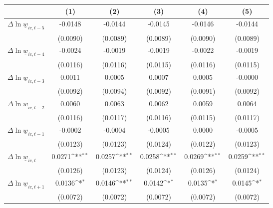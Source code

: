 {
\def\sym#1{\ifmmode^{#1}\else\(^{#1}\)\fi}
\begin{tabular}{l*{5}{c}}
\hline\hline
          &\multicolumn{1}{c}{(1)}         &\multicolumn{1}{c}{(2)}         &\multicolumn{1}{c}{(3)}         &\multicolumn{1}{c}{(4)}         &\multicolumn{1}{c}{(5)}         \\
\hline
$\Delta \ln \underline{w}_{ic,t-5}$&  -0.0148         &  -0.0144         &  -0.0145         &  -0.0146         &  -0.0144         \\
          & (0.0090)         & (0.0089)         & (0.0089)         & (0.0090)         & (0.0089)         \\
[1em]
$\Delta \ln \underline{w}_{ic,t-4}$&  -0.0024         &  -0.0019         &  -0.0019         &  -0.0022         &  -0.0019         \\
          & (0.0116)         & (0.0116)         & (0.0115)         & (0.0116)         & (0.0115)         \\
[1em]
$\Delta \ln \underline{w}_{ic,t-3}$&   0.0011         &   0.0005         &   0.0007         &   0.0005         &  -0.0000         \\
          & (0.0092)         & (0.0094)         & (0.0092)         & (0.0091)         & (0.0092)         \\
[1em]
$\Delta \ln \underline{w}_{ic,t-2}$&   0.0060         &   0.0063         &   0.0062         &   0.0059         &   0.0064         \\
          & (0.0116)         & (0.0117)         & (0.0116)         & (0.0115)         & (0.0117)         \\
[1em]
$\Delta \ln \underline{w}_{ic,t-1}$&  -0.0002         &  -0.0004         &  -0.0005         &   0.0000         &  -0.0005         \\
          & (0.0123)         & (0.0123)         & (0.0124)         & (0.0122)         & (0.0123)         \\
[1em]
$\Delta \ln \underline{w}_{ic,t}$&   0.0271\sym{**} &   0.0257\sym{**} &   0.0258\sym{**} &   0.0269\sym{**} &   0.0259\sym{**} \\
          & (0.0126)         & (0.0123)         & (0.0124)         & (0.0126)         & (0.0124)         \\
[1em]
$\Delta \ln \underline{w}_{ic,t+1}$&   0.0136\sym{*}  &   0.0146\sym{**} &   0.0142\sym{*}  &   0.0135\sym{*}  &   0.0145\sym{*}  \\
          & (0.0072)         & (0.0072)         & (0.0072)         & (0.0072)         & (0.0072)         \\

\end{tabular}}
